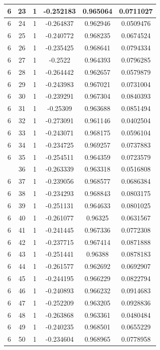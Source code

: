 \documentclass[12pt,a4paper]{article}
\numberwithin{equation}{section}
\numberwithin{figure}{section}
\numberwithin{table}{section}
\begin{document}
\begin{longtable}{|c|c|c|c|c|c|}
6 & 23 & 1 & -0.252183 & 0.965064 & 0.0711027 \\ \hline
6 & 24 & 1 & -0.264837 & 0.962946 & 0.0509476 \\ \hline
6 & 25 & 1 & -0.240772 & 0.968235 & 0.0674524 \\ \hline
6 & 26 & 1 & -0.235425 & 0.968641 & 0.0794334 \\ \hline
6 & 27 & 1 & -0.2522 & 0.964393 & 0.0796285 \\ \hline
6 & 28 & 1 & -0.264442 & 0.962657 & 0.0579879 \\ \hline
6 & 29 & 1 & -0.243983 & 0.967021 & 0.0731004 \\ \hline
6 & 30 & 1 & -0.239291 & 0.967304 & 0.0840393 \\ \hline
6 & 31 & 1 & -0.25309 & 0.963688 & 0.0851494 \\ \hline
6 & 32 & 1 & -0.273091 & 0.961146 & 0.0402504 \\ \hline
6 & 33 & 1 & -0.243071 & 0.968175 & 0.0596104 \\ \hline
6 & 34 & 1 & -0.234725 & 0.969257 & 0.0737883 \\ \hline
6 & 35 & 1 & -0.254511 & 0.964359 & 0.0723579 \\ \hline
\pagebreak
6 & 36 & 1 & -0.263339 & 0.963318 & 0.0516808 \\ \hline
6 & 37 & 1 & -0.239056 & 0.968577 & 0.0686384 \\ \hline
6 & 38 & 1 & -0.234293 & 0.968843 & 0.0803175 \\ \hline
6 & 39 & 1 & -0.251131 & 0.964633 & 0.0801025 \\ \hline
6 & 40 & 1 & -0.261077 & 0.96325 & 0.0631567 \\ \hline
6 & 41 & 1 & -0.241445 & 0.967336 & 0.0772308 \\ \hline
6 & 42 & 1 & -0.237715 & 0.967414 & 0.0871888 \\ \hline
6 & 43 & 1 & -0.251441 & 0.96388 & 0.0878183 \\ \hline
6 & 44 & 1 & -0.261577 & 0.962692 & 0.0692907 \\ \hline
6 & 45 & 1 & -0.244195 & 0.966229 & 0.0822794 \\ \hline
6 & 46 & 1 & -0.240893 & 0.966232 & 0.0914683 \\ \hline
6 & 47 & 1 & -0.252209 & 0.963205 & 0.0928836 \\ \hline
6 & 48 & 1 & -0.263868 & 0.963361 & 0.0480484 \\ \hline
6 & 49 & 1 & -0.240235 & 0.968501 & 0.0655229 \\ \hline
6 & 50 & 1 & -0.234604 & 0.968965 & 0.0778958 \\ \hline

\end{longtable}
\end{document}
